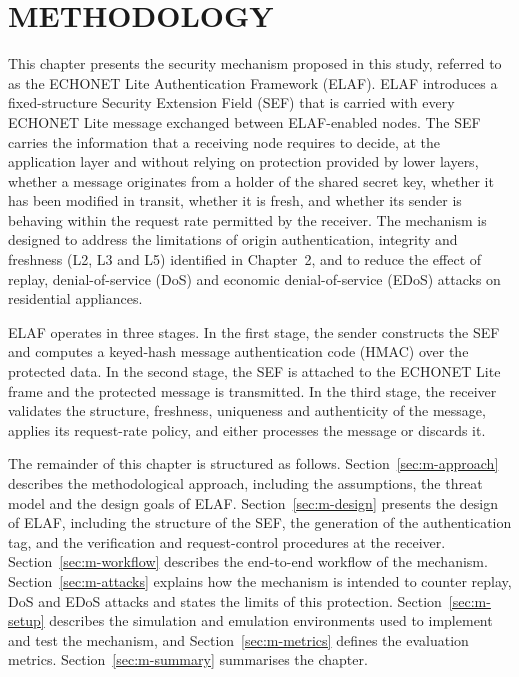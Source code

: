 \chapter{METHODOLOGY}
\label{ch:methodology}

This chapter presents the security mechanism proposed in this study, referred to as the ECHONET Lite Authentication Framework (ELAF). ELAF introduces a fixed-structure Security Extension Field (SEF) that is carried with every ECHONET Lite message exchanged between ELAF-enabled nodes. The SEF carries the information that a receiving node requires to decide, at the application layer and without relying on protection provided by lower layers, whether a message originates from a holder of the shared secret key, whether it has been modified in transit, whether it is fresh, and whether its sender is behaving within the request rate permitted by the receiver. The mechanism is designed to address the limitations of origin authentication, integrity and freshness (L2, L3 and L5) identified in Chapter~2, and to reduce the effect of replay, denial-of-service (DoS) and economic denial-of-service (EDoS) attacks on residential appliances.

ELAF operates in three stages. In the first stage, the sender constructs the SEF and computes a keyed-hash message authentication code (HMAC) over the protected data. In the second stage, the SEF is attached to the ECHONET Lite frame and the protected message is transmitted. In the third stage, the receiver validates the structure, freshness, uniqueness and authenticity of the message, applies its request-rate policy, and either processes the message or discards it.

The remainder of this chapter is structured as follows. Section~\ref{sec:m-approach} describes the methodological approach, including the assumptions, the threat model and the design goals of ELAF. Section~\ref{sec:m-design} presents the design of ELAF, including the structure of the SEF, the generation of the authentication tag, and the verification and request-control procedures at the receiver. Section~\ref{sec:m-workflow} describes the end-to-end workflow of the mechanism. Section~\ref{sec:m-attacks} explains how the mechanism is intended to counter replay, DoS and EDoS attacks and states the limits of this protection. Section~\ref{sec:m-setup} describes the simulation and emulation environments used to implement and test the mechanism, and Section~\ref{sec:m-metrics} defines the evaluation metrics. Section~\ref{sec:m-summary} summarises the chapter.

